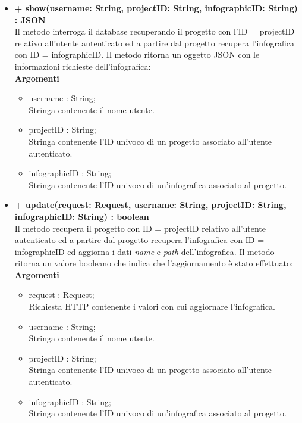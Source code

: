 \begin{itemize}
			\item \textbf{+ show(username: String, projectID: String, infographicID: String) : JSON}\\
			Il metodo interroga il database recuperando il progetto con l'ID = projectID relativo all'utente autenticato ed a partire dal progetto recupera l'infografica con ID = infographicID. Il metodo ritorna un oggetto JSON con le informazioni richieste dell'infografica:\\
			\textbf{Argomenti}
			\begin{itemize}
				\item username : String; \\
				Stringa contenente il nome utente.
				\item projectID : String; \\
				Stringa contenente l'ID univoco di un progetto associato all'utente autenticato.
				\item infographicID : String; \\
				Stringa contenente l'ID univoco di un'infografica associato al progetto.
			\end{itemize}
			
			\item \textbf{+ update(request: Request, username: String, projectID: String, infographicID: String) : boolean}\\
			Il metodo recupera il progetto con ID = projectID relativo all'utente autenticato ed a partire dal progetto recupera l'infografica con ID = infographicID ed aggiorna i dati \textit{name} e \textit{path} dell'infografica. Il metodo ritorna un valore booleano che indica che l'aggiornamento è stato effettuato:\\
			\textbf{Argomenti}
			\begin{itemize}
				\item request : Request;\\
				Richiesta HTTP contenente i valori con cui aggiornare l'infografica.
				\item username : String; \\
				Stringa contenente il nome utente.
				\item projectID : String; \\
				Stringa contenente l'ID univoco di un progetto associato all'utente autenticato.
				\item infographicID : String; \\
				Stringa contenente l'ID univoco di un'infografica associato al progetto.
			\end{itemize}
			

\end{itemize}
